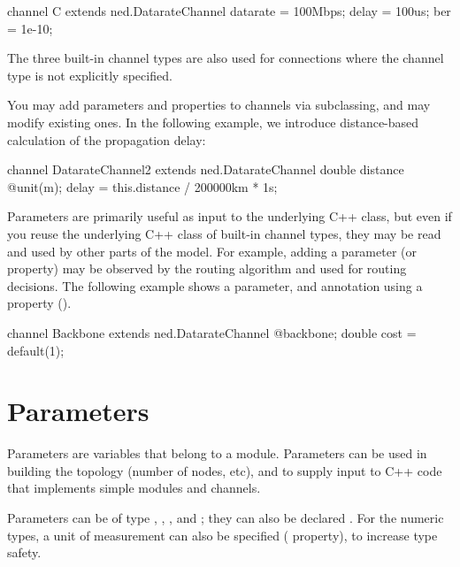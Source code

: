 \begin{ned}
channel C extends ned.DatarateChannel
{
    datarate = 100Mbps;
    delay = 100us;
    ber = 1e-10;
}
\end{ned}

\begin{note}
    The three built-in channel types are also used for connections where
    the channel type is not explicitly specified.
\end{note}

You may add parameters and properties to channels via subclassing, and
may modify existing ones. In the following example, we introduce distance-based
calculation of the propagation delay:

\begin{ned}
channel DatarateChannel2 extends ned.DatarateChannel
{
    double distance @unit(m);
    delay = this.distance / 200000km * 1s;
}
\end{ned}

Parameters are primarily useful as input to the underlying C++ class, but
even if you reuse the underlying C++ class of built-in channel types, they
may be read and used by other parts of the model. For example, adding a
 parameter (or  property) may be observed by the
routing algorithm and used for routing decisions. The following example
shows a  parameter, and annotation using a property
().

\begin{ned}
channel Backbone extends ned.DatarateChannel
{
    @backbone;
    double cost = default(1);
}
\end{ned}



\section{Parameters}
\label{sec:ch-ned-lang:parameters}

Parameters are variables that belong to a module. Parameters can be
used in building the topology (number of nodes, etc), and to supply
input to C++ code that implements simple modules and channels.

Parameters can be of type , ,
,  and ; they can also
be declared . For the numeric types, a unit of
measurement can also be specified ( property), to increase
type safety.

